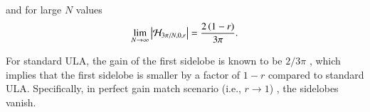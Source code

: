 and for large $N$ values 
\begin{equation*}
    \lim_{N\rightarrow\infty}\left\vert\mathcal{H}_{3\pi/N,0,r}\right\vert=\frac{
    2\left({1-r}\right)
    }{
    3\pi
    }.
\end{equation*}
\ifdefined\showDev
\else
\fi
\par For standard ULA, the gain of the first sidelobe is known to be $2/3\pi$ \cite{van2004optimum}, which implies that the first sidelobe is smaller by a factor of $1-r$ compared to standard ULA.
Specifically, in perfect gain match scenario (i.e., $r\to{}1$) , the sidelobes vanish. 
